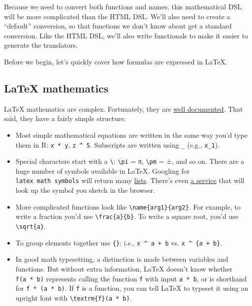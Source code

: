 Because we need to convert both functions and names, this mathematical
DSL will be more complicated than the HTML DSL. We'll also need to
create a ``default'' conversion, so that functions we don't know about
get a standard conversion. Like the HTML DSL, we'll also write
functionals to make it easier to generate the translators.

Before we begin, let's quickly cover how formulas are expressed in
LaTeX.

\hypertarget{latex-mathematics}{%
\subsection{LaTeX mathematics}\label{latex-mathematics}}

LaTeX mathematics are complex. Fortunately, they are
\href{http://en.wikibooks.org/wiki/LaTeX/Mathematics}{well documented}.
That said, they have a fairly simple structure:

\begin{itemize}
\item
  Most simple mathematical equations are written in the same way you'd
  type them in R: \texttt{x\ *\ y}, \texttt{z\ \^{}\ 5}. Subscripts are
  written using \texttt{\_} (e.g., \texttt{x\_1}).
\item
  Special characters start with a \texttt{\textbackslash{}}:
  \texttt{\textbackslash{}pi} = π, \texttt{\textbackslash{}pm} = ±, and
  so on. There are a huge number of symbols available in LaTeX. Googling
  for \texttt{latex\ math\ symbols} will return many
  \href{http://www.sunilpatel.co.uk/latex-type/latex-math-symbols/}{lists}.
  There's even \href{http://detexify.kirelabs.org/classify.html}{a
  service} that will look up the symbol you sketch in the browser.
\item
  More complicated functions look like
  \texttt{\textbackslash{}name\{arg1\}\{arg2\}}. For example, to write a
  fraction you'd use \texttt{\textbackslash{}frac\{a\}\{b\}}. To write a
  square root, you'd use \texttt{\textbackslash{}sqrt\{a\}}.
\item
  To group elements together use \texttt{\{\}}: i.e.,
  \texttt{x\ \^{}\ a\ +\ b} vs. \texttt{x\ \^{}\ \{a\ +\ b\}}.
\item
  In good math typesetting, a distinction is made between variables and
  functions. But without extra information, LaTeX doesn't know whether
  \texttt{f(a\ *\ b)} represents calling the function \texttt{f} with
  input \texttt{a\ *\ b}, or is shorthand for \texttt{f\ *\ (a\ *\ b)}.
  If \texttt{f} is a function, you can tell LaTeX to typeset it using an
  upright font with \texttt{\textbackslash{}textrm\{f\}(a\ *\ b)}.
\end{itemize}


